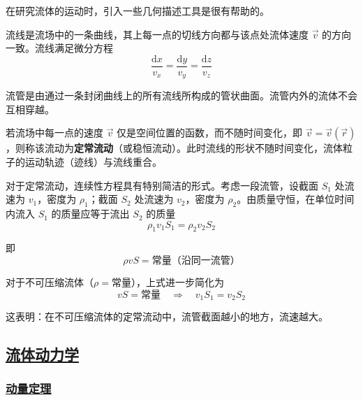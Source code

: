 在研究流体的运动时，引入一些几何描述工具是很有帮助的。

\begin{definition}[流线]
    流线是流场中的一条曲线，其上每一点的切线方向都与该点处流体速度 $\vec{v}$ 的方向一致。流线满足微分方程
    \begin{equation}
        \frac{\mathrm{d}x}{v_x} = \frac{\mathrm{d}y}{v_y} = \frac{\mathrm{d}z}{v_z}
    \end{equation}
\end{definition}

\begin{definition}[流管]
    流管是由通过一条封闭曲线上的所有流线所构成的管状曲面。流管内外的流体不会互相穿越。
\end{definition}

\begin{definition}[定常流动]
    若流场中每一点的速度 $\vec{v}$ 仅是空间位置的函数，而不随时间变化，即 $\vec{v} = \vec{v}(\vec{r})$，则称该流动为\textbf{定常流动}（或稳恒流动）。此时流线的形状不随时间变化，流体粒子的运动轨迹（迹线）与流线重合。
\end{definition}

对于定常流动，连续性方程具有特别简洁的形式。考虑一段流管，设截面 $S_1$ 处流速为 $v_1$，密度为 $\rho_1$；截面 $S_2$ 处流速为 $v_2$，密度为 $\rho_2$。由质量守恒，在单位时间内流入 $S_1$ 的质量应等于流出 $S_2$ 的质量
\begin{equation}
    \rho_1 v_1 S_1 = \rho_2 v_2 S_2
\end{equation}

即
\begin{equation}
    \rho v S = \text{常量（沿同一流管）}
\end{equation}

对于不可压缩流体（$\rho = \text{常量}$），上式进一步简化为
\begin{equation}
    v S = \text{常量} \quad \Longrightarrow \quad v_1 S_1 = v_2 S_2
\end{equation}

这表明：在不可压缩流体的定常流动中，流管截面越小的地方，流速越大。

\subsection{\protect\hyperlink{:}{流体动力学}}

\subsubsection{\protect\hyperlink{:}{动量定理}}

